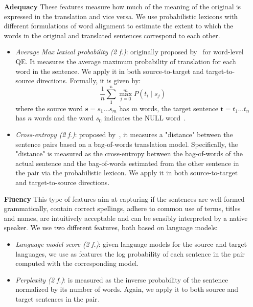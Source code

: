 \textbf{Adequacy} These features measure how much of the meaning of the original is expressed in the translation and vice versa. We use probabilistic lexicons with different formulations of word alignment to estimate the extent to which the words in the original and translated sentences correspond to each other. 
\begin{itemize}
\item \textit{Average Max lexical probability (2 f.)}: originally proposed by~\cite{Ueffing05} for word-level QE. It measures the average maximum probability of translation for each word in the sentence. We apply it in both source-to-target and target-to-source directions. Formally, it is given by:
$$ \frac{1}{n}\sum_1^n\max_{j=0}^m P(t_i\mid s_j) $$
where the source word $\mathbf{s}=s_1\ldots s_m$ has $m$ words, the target sentence $\mathbf{t}=t_1\ldots t_n$ has $n$ words and the word $s_0$ indicates the NULL word~\cite{Brown93}.
\item \textit{Cross-entropy (2 f.)}: proposed by~\cite{Hainan17}, it measures a "distance" between the sentence pairs based on a bag-of-words translation model. Specifically, the "distance" is measured as the cross-entropy between the bag-of-words of the actual sentence and the bag-of-words estimated from the other sentence in the pair via the probabilistic lexicon. We apply it in both source-to-target and target-to-source directions.
\end{itemize}

\textbf{Fluency} This type of features aim at capturing if the sentences are well-formed grammatically, contain correct spellings, adhere to common use of terms, titles and names, are intuitively acceptable and can be sensibly interpreted by a native speaker. We use two different features, both based on language models:
\begin{itemize}
\item \textit{Language model score (2 f.)}: given language models for the source and target languages, we use as features the log probability of each sentence in the pair computed with the corresponding model.
\item \textit{Perplexity (2 f.)}: is measured as the inverse probability of the sentence normalized by its number of words. Again, we apply it to both source and target sentences in the pair.
\end{itemize}

